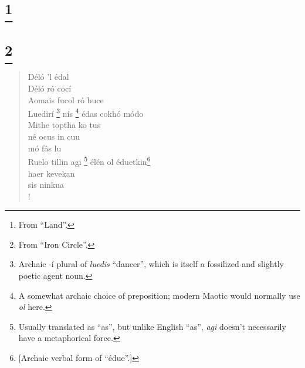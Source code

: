\documentclass{article}
\let\oldthefootnote\thefootnote
\newcommand\oocfootnote[2][DarkGreen]{\renewcommand\thefootnote{\color{#1}\oldthefootnote}%
  \footnote{\color{#1}#2}%
  \renewcommand{\thefootnote}{\oldthefootnote}}
\begin{document}
\section{\oocfootnote{From ``Land''.}}


\begin{verse}
\end{verse}


\section{\oocfootnote{From ``Iron Circle''.}}


\begin{verse}


Déló 'l édal \\
Déló ró cocí \\
Aomais fucol ró buce \\
Luedirí\oocfootnote{Archaic -í plural of \emph{luedis} ``dancer'', which is itself a fossilized and slightly poetic agent noun.} nís\oocfootnote{A somewhat archaic choice of preposition; modern Maotic would normally use \emph{ol} here.} édas cokhó módo \\
Mithe toptha ko tus \\
\hspace{1em} né ocus in cuu \\
\hspace{1em} mó fâs lu \\
Ruelo tillin agi\oocfootnote{Usually translated as ``as'', but unlike English ``as'', \emph{agi} doesn't necessarily have a metaphorical force.} élén ol éduetkin\footnote{[Archaic verbal form of ``édue''.]} \\
\hspace{1em} haer kevekan \\
\hspace{1em} sis ninkua \\!

\end{verse}
\end{document}

